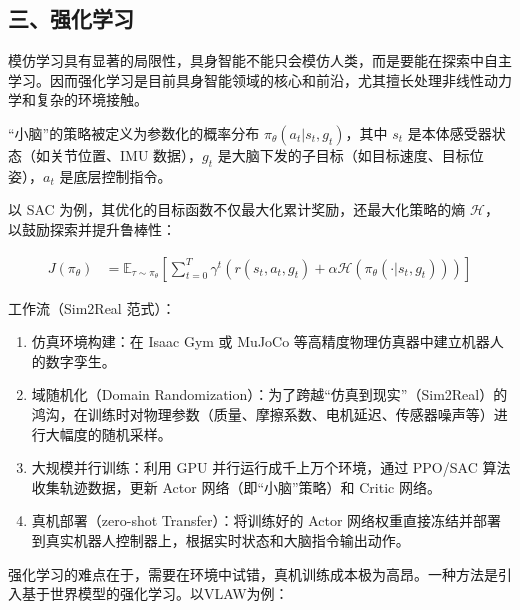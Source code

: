\hypertarget{ux4e09ux5f3aux5316ux5b66ux4e60}{%
\subsection{三、强化学习}\label{ux4e09ux5f3aux5316ux5b66ux4e60}}

模仿学习具有显著的局限性，具身智能不能只会模仿人类，而是要能在探索中自主学习。因而强化学习是目前具身智能领域的核心和前沿，尤其擅长处理非线性动力学和复杂的环境接触。

``小脑''的策略被定义为参数化的概率分布 \(\pi_\theta(a_t|s_t,g_t)\)，其中 \(s_t\) 是本体感受器状态（如关节位置、IMU 数据），\(g_t\) 是大脑下发的子目标（如目标速度、目标位姿），\(a_t\) 是底层控制指令。

以 SAC 为例，其优化的目标函数不仅最大化累计奖励，还最大化策略的熵 \(\mathcal{H}\)，以鼓励探索并提升鲁棒性：

\[
\begin{aligned}
J(\pi_\theta)
&=
\mathbb{E}_{\tau\sim\pi_\theta}
\left[
\sum_{t=0}^{T}
\gamma^t
\left(
r(s_t,a_t,g_t)+
\alpha\mathcal{H}(\pi_\theta(\cdot|s_t,g_t))
\right)
\right]
\end{aligned}
\]

工作流（Sim2Real 范式）：

\begin{enumerate}
\def\labelenumi{\arabic{enumi}.}
\tightlist
\item
  仿真环境构建：在 Isaac Gym 或 MuJoCo 等高精度物理仿真器中建立机器人的数字孪生。
\item
  域随机化（Domain Randomization）：为了跨越``仿真到现实''（Sim2Real）的鸿沟，在训练时对物理参数（质量、摩擦系数、电机延迟、传感器噪声等）进行大幅度的随机采样。
\item
  大规模并行训练：利用 GPU 并行运行成千上万个环境，通过 PPO/SAC 算法收集轨迹数据，更新 Actor 网络（即``小脑''策略）和 Critic 网络。
\item
  真机部署（zero-shot Transfer）：将训练好的 Actor 网络权重直接冻结并部署到真实机器人控制器上，根据实时状态和大脑指令输出动作。
\end{enumerate}

强化学习的难点在于，需要在环境中试错，真机训练成本极为高昂。一种方法是引入基于世界模型的强化学习。以VLAW为例：

